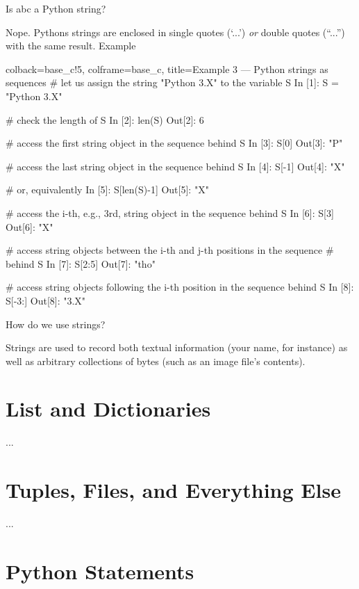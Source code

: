 \documentclass[a4paper,11pt]{book}
\newcommand{\question}[1]{%
    \begin{tcolorbox}[colback=comp_c!10,colframe=comp_c,sidebyside align=top,width=\linewidth,before skip=1ex]
        #1
    \end{tcolorbox}%
    \switchcolumn%
}
\newcommand{\note}[1]{%
    \begin{tcolorbox}[colback=white!0,colframe=white!10,width=\linewidth,before skip=1ex]
        #1
    \end{tcolorbox}         
}
\begin{document}
\begin{paracol}{2}
	\question{Is abc a Python string?}
	\note{Nope. Pythons strings are enclosed in single quotes (`...') \textit{or} double quotes (``...'') with the same result. Example }
\end{paracol}

\begin{pythoncode}[linenos=true,]{colback=base_c!5, colframe=base_c, title=\sffamily Example 3 --- Python strings as sequences}
# let us assign the string "Python 3.X" to the variable S
In [1]: S = "Python 3.X"

# check the length of S
In [2]: len(S)
Out[2]: 6

# access the first string object in the sequence behind S 	
In [3]: S[0]
Out[3]: "P"

# access the last string object in the sequence behind S
In [4]: S[-1]
Out[4]: "X"

# or, equivalently
In [5]: S[len(S)-1]
Out[5]: "X"

# access the i-th, e.g., 3rd, string object in the sequence behind S
In [6]: S[3]
Out[6]: "X"

# access string objects between the i-th and j-th positions in the sequence 
# behind S
In [7]: S[2:5]
Out[7]: "tho"

# access string objects following the i-th position in the sequence behind S
In [8]: S[-3:]
Out[8]: "3.X"

\end{pythoncode}

\begin{paracol}{2}
	\question{How do we use strings?}
	\note{Strings are used to record both textual information (your name, for instance) as well as arbitrary collections of bytes (such as an image file’s contents).}
\end{paracol}

\section{List and Dictionaries}

...


\section{Tuples, Files, and Everything Else}

...


\section{Python Statements}
\end{document}
